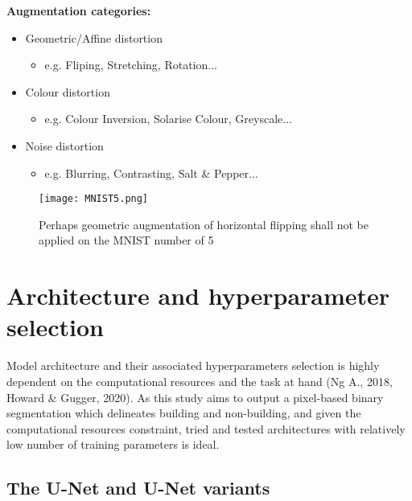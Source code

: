 \documentclass[11pt, a4paper, twoside]{report}
\begin{document}
\textbf{Augmentation categories:}

\begin{itemize}
  \item Geometric/Affine distortion
    \begin{itemize}
      \item e.g. Fliping, Stretching, Rotation...
    \end{itemize}
\end{itemize}
\begin{itemize}
  \item Colour distortion
    \begin{itemize}
      \item e.g. Colour Inversion, Solarise Colour, Greyscale...
    \end{itemize}
\end{itemize}
\begin{itemize}
  \item Noise distortion
    \begin{itemize}
      \item e.g. Blurring, Contrasting, Salt \& Pepper...
    \end{itemize}
\end{itemize}


\begin{figure}[h]
  \centering
  \texttt{[image: MNIST5.png]}
  \caption{Perhaps geometric augmentation of horizontal flipping shall not be applied on the MNIST number of 5}
  \label{fig:MNIST5}
\end{figure}


\section{Architecture and hyperparameter selection}\label{Archi}

Model architecture and their associated hyperparameters selection is highly dependent on the computational resources and the task at hand (Ng A., 2018, Howard \& Gugger, 2020). As this study aims to output a pixel-based binary segmentation which delineates building and non-building, and given the computational resources constraint, tried and tested architectures with relatively low number of training parameters is ideal.

\subsection{The U-Net and U-Net variants}\label{Unet}
\end{document}
